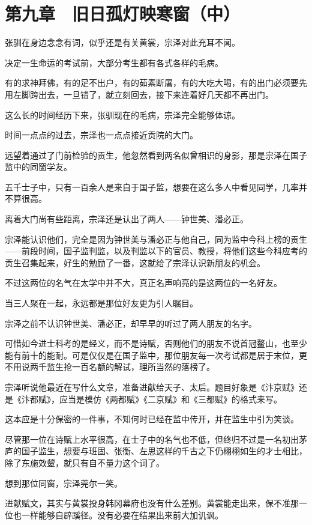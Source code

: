 \section{第九章　旧日孤灯映寒窗（中）}

张驯在身边念念有词，似乎还是有关黄裳，宗泽对此充耳不闻。

决定一生命运的考试前，大部分考生都有各式各样的毛病。

有的求神拜佛，有的足不出户，有的茹素断屠，有的大吃大喝，有的出门必须要先用左脚跨出去，一旦错了，就立刻回去，接下来连着好几天都不再出门。

这么长的时间经历下来，张驯现在的毛病，宗泽完全能够体谅。

时间一点点的过去，宗泽也一点点接近贡院的大门。

远望着通过了门前检验的贡生，他忽然看到两名似曾相识的身影，那是宗泽在国子监中的同窗学友。

五千士子中，只有一百余人是来自于国子监，想要在这么多人中看见同学，几率并不算很高。

离着大门尚有些距离，宗泽还是认出了两人——钟世美、潘必正。

宗泽能认识他们，完全是因为钟世美与潘必正与他自己，同为监中今科上榜的贡生——前段时间，国子监判监，以及判监以下的官员、教授，将他们这些今科应考的贡生召集起来，好生的勉励了一番，这就给了宗泽认识新朋友的机会。

不过这两位的名气在太学中并不大，真正名声响亮的是这两位的一名好友。

当三人聚在一起，永远都是那位好友更为引人瞩目。

宗泽之前不认识钟世美、潘必正，却早早的听过了两人朋友的名字。

可惜如今进士科考的是经义，而不是诗赋，否则他们的朋友不说首冠鳌山，也至少能有前十的能耐。可是仅仅是在国子监中，那位朋友每一次考试都是居于末位，更不用说两千监生抢一百名额的解试，理所当然的落榜了。

宗泽听说他最近在写什么文章，准备进献给天子、太后。题目好象是《汴京赋》还是《汴都赋》，应当是模仿《两都赋》《二京赋》和《三都赋》的格式来写。

这本应是十分保密的一件事，不知何时已经在监中传开，并在监生中引为笑谈。

尽管那一位在诗赋上水平很高，在士子中的名气也不低，但终归不过是一名初出茅庐的国子监生，想要与班固、张衡、左思这样的千古之下仍栩栩如生的才士相比，除了东施效颦，就只有自不量力这个词了。

想到那位同窗，宗泽莞尔一笑。

进献赋文，其实与黄裳投身韩冈幕府也没有什么差别。黄裳能走出来，保不准那一位也一样能够自辟蹊径。没有必要在结果出来前大加讥讽。

